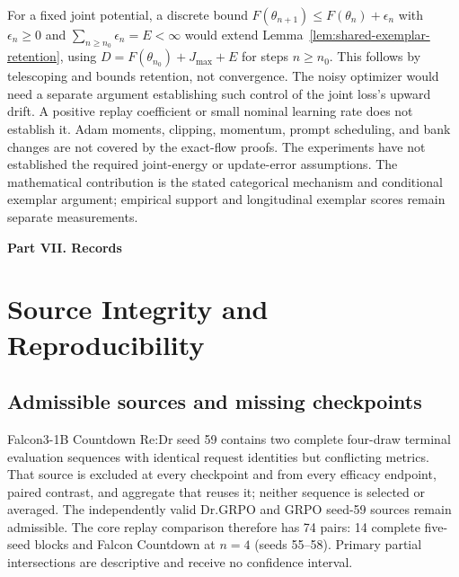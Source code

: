 \documentclass{article}
\newcommand{\1}{\mathbf 1}
\theoremstyle{remark}
\theoremstyle{definition}
\theoremstyle{plain}
\begin{document}
For a fixed joint potential, a discrete bound
$F(\theta_{n+1})\le F(\theta_n)+\epsilon_n$ with
$\epsilon_n\ge0$ and $\sum_{n\ge n_0}\epsilon_n=E<\infty$ would extend
Lemma~\ref{lem:shared-exemplar-retention}, using
$D=F(\theta_{n_0})+J_{\max}+E$ for steps $n\ge n_0$.
This follows by telescoping and bounds retention, not convergence. The noisy
optimizer would need a separate argument establishing such control of the
joint loss's upward drift. A positive replay coefficient or small nominal
learning rate does not establish it. Adam moments, clipping, momentum, prompt
scheduling, and bank changes are not covered by the exact-flow proofs.
The experiments have not established the required joint-energy or
update-error assumptions. The mathematical contribution is the stated
categorical mechanism and conditional exemplar argument; empirical support
and longitudinal exemplar scores remain separate measurements.


\clearpage
{}
\begin{center}\large\textbf{Part VII. Records}\end{center}

\section{Source Integrity and Reproducibility}
\label{app:reproducibility}

\subsection{Admissible sources and missing checkpoints}
\label{app:source-integrity}

Falcon3-1B Countdown Re:Dr seed 59 contains two complete four-draw
terminal evaluation sequences with identical request identities but
conflicting metrics. That source is excluded at every
checkpoint and from every efficacy endpoint, paired contrast, and aggregate
that reuses it; neither sequence is selected or averaged. The independently
valid Dr.GRPO and GRPO seed-59 sources remain admissible. The core replay
comparison therefore has 74 pairs: 14 complete five-seed blocks and Falcon
Countdown at $n=4$ (seeds 55--58). Primary partial intersections are
descriptive and receive no confidence interval.
\end{document}
